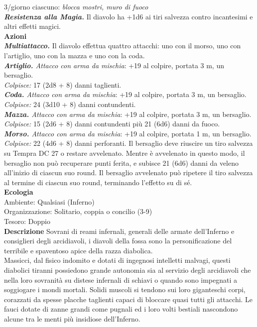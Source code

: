 \begin{multicols}{2}
3/giorno ciascuno: \emph{blocca mostri, muro di fuoco}\\
\emph{\textbf{Resistenza alla Magia.}} Il diavolo ha +1d6 ai tiri salvezza contro incantesimi e altri effetti magici.\\
\smallskip\textbf{Azioni}\\
\emph{\textbf{Multiattacco.}} Il diavolo effettua quattro attacchi: uno con il morso, uno con l'artiglio, uno con la mazza e uno con la coda.\\
\emph{\textbf{Artiglio.} Attacco con arma da mischia}: +19 al colpire, portata 3 m, un bersaglio.\\
\emph{Colpisce:} 17 (2d8 + 8) danni taglienti.\\
\emph{\textbf{Coda.} Attacco con arma da mischia}: +19 al colpire, portata 3 m, un bersaglio.\\
\emph{Colpisce:} 24 (3d10 + 8) danni contundenti.\\
\emph{\textbf{Mazza.} Attacco con arma da mischia}: +19 al colpire, portata 3 m, un bersaglio.\\
\emph{Colpisce:} 15 (2d6 + 8) danni contundenti più 21 (6d6) danni da fuoco.\\
\emph{\textbf{Morso.} Attacco con arma da mischia}: +19 al colpire, portata 1 m, un bersaglio.\\
\emph{Colpisce:} 22 (4d6 + 8) danni perforanti. Il bersaglio deve riuscire un tiro salvezza su Tempra DC  27 o restare avvelenato. Mentre è avvelenato in questo modo, il bersaglio non può recuperare punti ferita, e subisce 21 (6d6) danni da veleno all'inizio di ciascun suo round. Il bersaglio avvelenato può ripetere il tiro salvezza al termine di ciascun suo round, terminando l'effetto su di sé. \\
\textbf{Ecologia}\\
Ambiente: Qualsiasi (Inferno)\\
Organizzazione: Solitario, coppia o concilio (3-9)\\
Tesoro: Doppio\\
\textbf{Descrizione}
Sovrani di reami infernali, generali delle armate dell'Inferno e consiglieri degli arcidiavoli, i diavoli della fossa sono la personificazione del terribile e spaventoso apice della razza diabolica.\\
Massicci, dal fisico indomito e dotati di ingegnosi intelletti malvagi, questi diabolici tiranni possiedono grande autonomia sia al servizio degli arcidiavoli che nella loro sovranità su distese infernali di schiavi o quando sono impegnati a soggiogare i mondi mortali. Solidi muscoli si tendono sui loro giganteschi corpi, corazzati da spesse placche taglienti capaci di bloccare quasi tutti gli attacchi. Le fauci dotate di zanne grandi come pugnali ed i loro volti bestiali nascondono alcune tra le menti più insidiose dell'Inferno.\\

\end{multicols}
